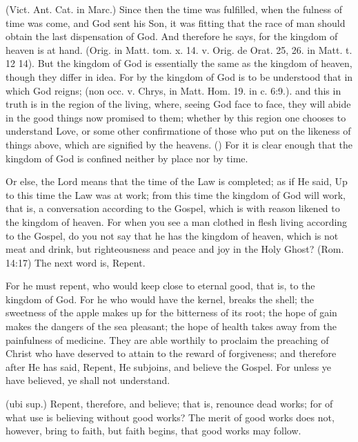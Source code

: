  (Vict. Ant. Cat. in Marc.) Since then the time was fulfilled, when the fulness of time was come, and God sent his Son, it was fitting that the race of man should obtain the last dispensation of God. And therefore he says, for the kingdom of heaven is at hand. (Orig. in Matt. tom. x. 14. v. Orig. de Orat. 25, 26. in Matt. t. 12 14). But the kingdom of God is essentially the same as the kingdom of heaven, though they differ in idea. For by the kingdom of God is to be understood that in which God reigns; (non occ. v. Chrys, in Matt. Hom. 19. in c. 6:9.). and this in truth is in the region of the living, where, seeing God face to face, they will abide in the good things now promised to them; whether by this region one chooses to understand Love, or some other confirmatione of those who put on the likeness of things above, which are signified by the heavens. () For it is clear enough that the kingdom of God is confined neither by place nor by time.

 Or else, the Lord means that the time of the Law is completed; as if He said, Up to this time the Law was at work; from this time the kingdom of God will work, that is, a conversation according to the Gospel, which is with reason likened to the kingdom of heaven. For when you see a man clothed in flesh living according to the Gospel, do you not say that he has the kingdom of heaven, which is not meat and drink, but righteousness and peace and joy in the Holy Ghost? (Rom. 14:17) The next word is, Repent.

 For he must repent, who would keep close to eternal good, that is, to the kingdom of God. For he who would have the kernel, breaks the shell; the sweetness of the apple makes up for the bitterness of its root; the hope of gain makes the dangers of the sea pleasant; the hope of health takes away from the painfulness of medicine. They are able worthily to proclaim the preaching of Christ who have deserved to attain to the reward of forgiveness; and therefore after He has said, Repent, He subjoins, and believe the Gospel. For unless ye have believed, ye shall not understand.

 (ubi sup.) Repent, therefore, and believe; that is, renounce dead works; for of what use is believing without good works? The merit of good works does not, however, bring to faith, but faith begins, that good works may follow.

 

